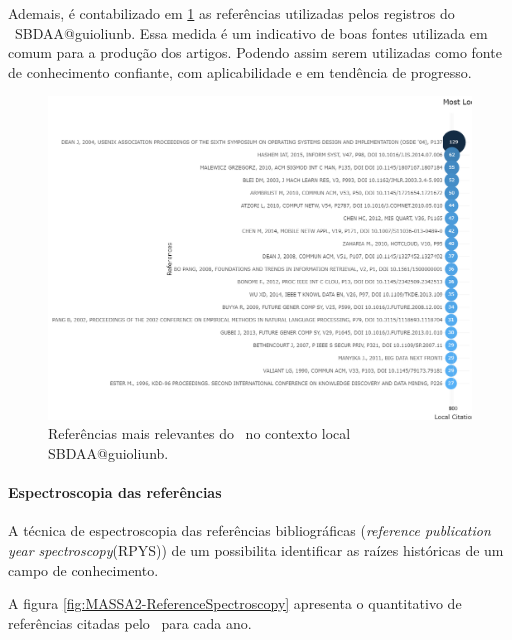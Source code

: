 Ademais, é contabilizado em \ref{fig:SBDAA@guioliunb:doc:relevantdocuments} as referências utilizadas pelos registros do \dataset\ SBDAA@guioliunb. Essa medida é um indicativo de boas fontes utilizada em comum para a produção dos artigos. Podendo assim serem utilizadas como fonte de conhecimento confiante, com aplicabilidade e em tendência de progresso.  

\begin{figure}
    \centering
    \includegraphics[angle=0,width=1\textwidth]{experiments/guioliunb/AnaliseBibliometrica/SocialBigDataAnalysis/MOST LOCAL CITED DOC.png}
    \caption{Referências mais relevantes do \dataset\ no contexto local   SBDAA@guioliunb.}
    \label{fig:SBDAA@guioliunb:doc:relevantdocuments}
\end{figure}

\paragraph{Espectroscopia das referências}

A técnica de espectroscopia das referências bibliográficas (\textit{reference publication year spectroscopy}(RPYS)) de um \dataset \cite{marx_detecting_2014} possibilita identificar as raízes históricas de um campo de conhecimento. 

A figura \ref{fig:MASSA2-ReferenceSpectroscopy} apresenta o quantitativo de referências citadas pelo \dataset\, para cada ano.

